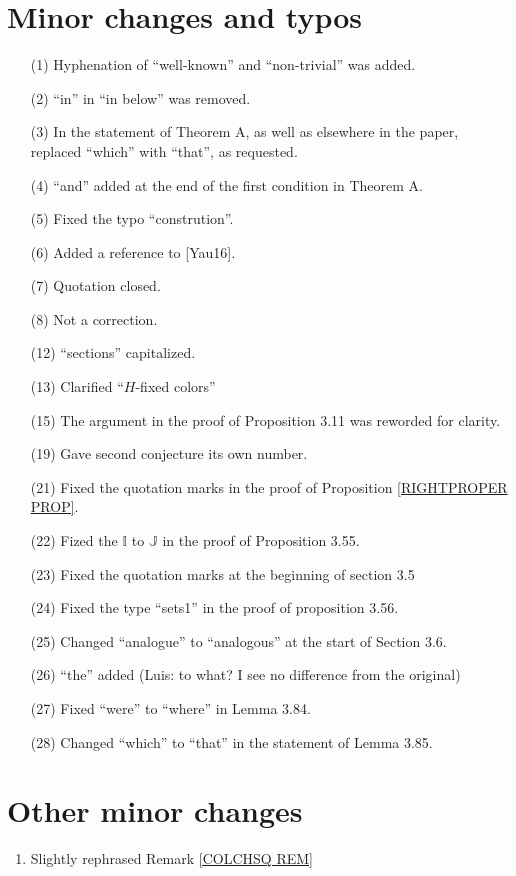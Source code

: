 \documentclass[a4paper,10pt
]{article}%
\numberwithin{equation}{section}
\numberwithin{figure}{section}
\theoremstyle{definition} %
\newcommand{\1}{\ensuremath{\mathbbm 1}}%
\begin{document}
\section{Minor changes and typos}
 

\begin{enumerate}
\item[(1)] Hyphenation of ``well-known'' and ``non-trivial'' was added.
\item[(2)] ``in'' in ``in below'' was removed.
\item[(3)] In the statement of Theorem A, as well as elsewhere in the paper, replaced ``which'' with ``that'', as requested.
\item[(4)] ``and'' added at the end of the first condition in Theorem A.
\item[(5)] Fixed the typo ``constrution''. 
\item[(6)] Added a reference to [Yau16].
\item[(7)] Quotation closed.
\item[(8)] Not a correction.
\item[(12)] ``sections'' capitalized.
\item[(13)] Clarified ``$H$-fixed colors''
\item[(15)] The argument in the proof of Proposition 3.11 was reworded for clarity.
\item[(19)] Gave second conjecture its own number.
\item[(21)] Fixed the quotation marks in the proof of Proposition \ref{RIGHTPROPER PROP}.
\item[(22)] Fized the $\mathbb{I}$ to $\mathbb{J}$
in the proof of Proposition 3.55.
\item[(23)] Fixed the quotation marks at the beginning of section 3.5
\item[(24)] Fixed the type ``sets1'' in the proof of proposition 3.56.
\item[(25)] Changed ``analogue'' to ``analogous'' at the start of Section 3.6.
\item[(26)] ``the'' added ({\color{red}Luis: to what? I see no difference from the original})
\item[(27)] Fixed ``were'' to ``where'' in Lemma 3.84.
\item[(28)] Changed ``which'' to ``that'' in the statement of Lemma 3.85.
\end{enumerate}

\section{Other minor changes}

\begin{enumerate}
\item Slightly rephrased Remark \ref{COLCHSQ REM}
\end{enumerate}





% 
\end{document}
